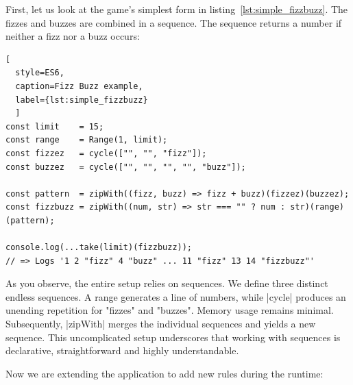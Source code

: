 First, let us look at the game's simplest form in listing~\ref{lst:simple_fizzbuzz}. 
The fizzes and buzzes are combined in a sequence. 
The sequence returns a number if neither a fizz nor a buzz occurs:

\begin{lstlisting}[
  style=ES6, 
  caption=Fizz Buzz example,
  label={lst:simple_fizzbuzz}
  ]
const limit    = 15;
const range    = Range(1, limit);
const fizzez   = cycle(["", "", "fizz"]);
const buzzez   = cycle(["", "", "", "", "buzz"]);

const pattern  = zipWith((fizz, buzz) => fizz + buzz)(fizzez)(buzzez);
const fizzbuzz = zipWith((num, str) => str === "" ? num : str)(range)(pattern);

console.log(...take(limit)(fizzbuzz));
// => Logs '1 2 "fizz" 4 "buzz" ... 11 "fizz" 13 14 "fizzbuzz"'
\end{lstlisting}

As you observe, the entire setup relies on sequences. We define three
distinct endless sequences. A range generates a line of numbers, while |cycle|
produces an unending repetition for "fizzes" and "buzzes". Memory usage remains
minimal. Subsequently, |zipWith| merges the individual sequences and yields a
new sequence. This uncomplicated setup underscores that working with sequences
is declarative, straightforward and highly understandable.

Now we are extending the application to add new rules during the runtime:

